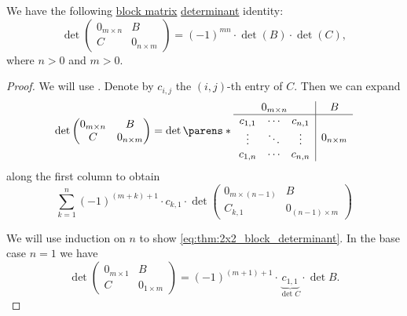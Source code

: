 \begin{lemma}\label{thm:2x2_block_antidiagonal_determinant}
  We have the following \hyperref[def:block_matrix]{block matrix} \hyperref[def:determinant]{determinant} identity:
  \begin{equation}\label{eq:thm:2x2_block_determinant}
    \det
    \begin{pmatrix}
      0_{m \times n} & B              \\
      C              & 0_{n \times m}
    \end{pmatrix}
    =
    (-1)^{mn} \cdot \det(B) \cdot \det(C),
  \end{equation}
  where \( n > 0 \) and \( m > 0 \).
\end{lemma}
\begin{proof}
  We will use . Denote by \( c_{i,j} \) the \( (i, j) \)-th entry of \( C \). Then we can expand
  \begin{equation*}
    \det
    \begin{pmatrix}
      0_{m \times n} & B              \\
      C              & 0_{n \times m}
    \end{pmatrix}
    =
    \det
    \parens*
      {
        \begin{array}{c | c}
          0_{m \times n} & B              \\
          \hline
          \begin{matrix}
             c_{1,1} & \cdots & c_{n,1} \\
             \vdots  & \ddots & \vdots  \\
             c_{1,n} & \cdots & c_{n,n}
          \end{matrix} & 0_{n \times m}
        \end{array}
      }
  \end{equation*}
  along the first column to obtain
  \begin{equation*}
    \sum_{k=1}^n (-1)^{(m + k) + 1} \cdot c_{k,1} \cdot \det
    \begin{pmatrix}
      0_{m \times (n-1)} & B                  \\
      C_{k,1}            & 0_{(n-1) \times m}
    \end{pmatrix}
  \end{equation*}

  We will use induction on \( n \) to show \eqref{eq:thm:2x2_block_determinant}. In the base case \( n = 1 \) we have
  \begin{equation*}
    \det
    \begin{pmatrix}
      0_{m \times 1} & B              \\
      C              & 0_{1 \times m}
    \end{pmatrix}
    =
    (-1)^{(m + 1) + 1} \cdot \underbrace{c_{1,1}}_{\det C} \cdot \det B.
  \end{equation*}


\end{proof}
